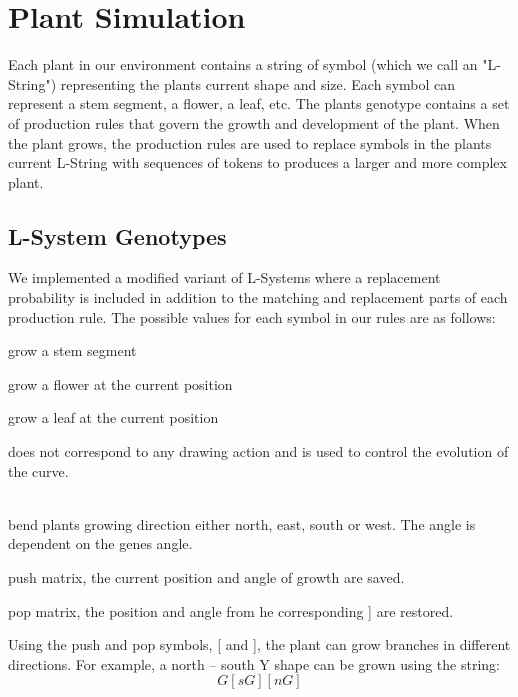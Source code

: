 \documentclass[conference]{acmsiggraph}
\begin{document}
\section{Plant Simulation}

Each plant in our environment contains a string of symbol (which we call an
"L-String") representing the plants current shape and size. Each symbol can
represent a stem segment, a flower, a leaf, etc. The plants genotype contains a
set of production rules that govern the growth and development of the plant.
When the plant grows, the production rules are used to replace symbols in the
plants current L-String with sequences of tokens to produces a larger and more
complex plant.

\subsection{L-System Genotypes}

We implemented a modified variant of L-Systems where a replacement probability
is included in addition to the matching and replacement parts of each production
rule. The possible values for each symbol in our rules are as follows:

\begin{description}[leftmargin=!,labelindent=0.2in,labelwidth=0.1in]
  \item[G]   grow a stem segment
  \item[F]   grow a flower at the current position
  \item[L]   grow a leaf at the current position
  \item[X]   does not correspond to any drawing action and is used to control
             the evolution of the curve.\cite{lsystems}
  \item[n, e, s, w] \hfill \\
             bend plants growing direction either north, east, south or west.
             The angle is dependent on the genes angle.
  \item[{[}] push matrix, the current position and angle of growth are saved.
  \item[{]}] pop matrix, the position and angle from he corresponding {]} are
             restored.
\end{description}

Using the push and pop symbols, {[} and {]}, the plant can grow branches in
different directions. For example, a north -- south Y shape can be grown using
the string: \[ G [ s G ] [ n G ] \]
\end{document}

